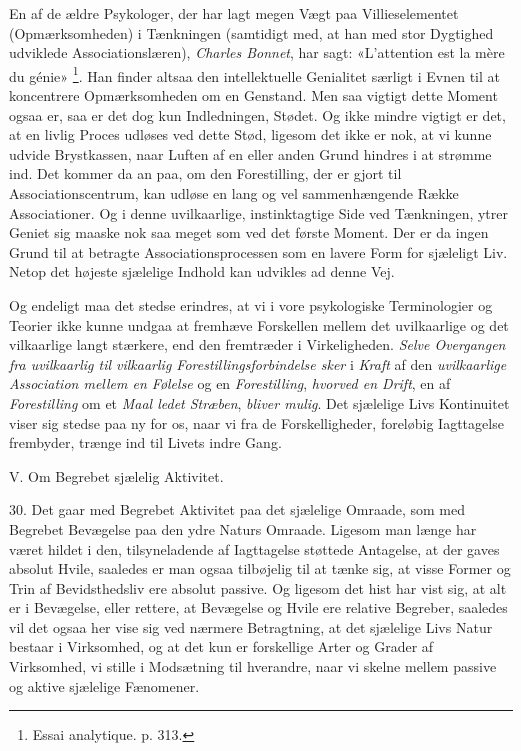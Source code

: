 \documentclass[12pt,a4paper,openany]{book}
\newcommand{\opage}[1]{\marginnote{\footnotesize\textit{[#1]}}}
\begin{document}
En af de ældre Psykologer, der har lagt megen Vægt paa Villieselementet
(Opmærksomheden) i Tænkningen (samtidigt med, at han med stor Dygtighed
udviklede Associationslæren), \emph{Charles Bonnet}, har sagt: «L'attention est
la mère du génie»%
\footnote[1]{Essai analytique. p. 313.}. Han finder altsaa den intellektuelle
Genialitet særligt i Evnen til at koncentrere Opmærksomheden om en Genstand.
Men saa vigtigt dette Moment ogsaa er, saa er det dog kun Indledningen, Stødet.
Og ikke mindre vigtigt er det, at en livlig Proces udløses ved dette Stød,
ligesom det ikke er nok, at vi kunne udvide Brystkassen, naar Luften af en
eller anden Grund hindres i at strømme ind. Det kommer da an paa, om den
Forestilling, der er gjort til Associationscentrum, kan udløse en lang og vel
sammenhængende Række Associationer. Og i denne uvilkaarlige, instinktagtige
Side ved Tænkningen, ytrer Geniet sig maaske nok saa meget som ved det første
Moment. Der er da ingen Grund til at betragte Associationsprocessen som en
lavere Form for sjæleligt Liv. Netop det højeste sjælelige Indhold kan udvikles
ad denne Vej.

Og endeligt maa det stedse erindres, at vi i vore psykologiske Terminologier og
Teorier ikke kunne undgaa at fremhæve Forskellen mellem det uvilkaarlige og det
vilkaarlige langt stærkere, end den fremtræder i Virkeligheden. \emph{Selve
Overgangen fra uvilkaarlig til vilkaarlig Forestillingsforbindelse sker} i
\emph{Kraft} af den \emph{uvilkaarlige Association mellem en Følelse} og en
\emph{Forestilling}, \emph{hvorved en Drift}, en af \emph{Forestilling} om et
\emph{Maal ledet Stræben}, \emph{bliver mulig}. Det sjælelige Livs Kontinuitet
viser sig stedse paa ny for os, naar vi fra de Forskelligheder, foreløbig
Iagttagelse frembyder, trænge ind til Livets indre Gang.

\begin{center}\large V. Om Begrebet sjælelig Aktivitet.\end{center}

30. Det gaar med Begrebet Aktivitet paa det sjælelige Omraade, som med Begrebet
Bevægelse paa den ydre Naturs Omraade. Ligesom man længe har været hildet i
den, tilsyneladende af Iagttagelse støttede Antagelse, at der gaves absolut
Hvile, saaledes er man ogsaa tilbøjelig til at tænke sig, at visse Former og
Trin af Bevidsthedsliv ere absolut passive. Og ligesom det hist har vist sig,
at alt er i Bevægelse, eller rettere, at Bevægelse og Hvile ere relative
Begreber, saaledes vil det ogsaa her vise sig ved nærmere Betragtning, at det
sjælelige Livs Natur bestaar i Virksomhed, og at det kun er forskellige
\setcounter{footnote}{0}%
\opage{68}Arter og Grader af Virksomhed, vi stille i Modsætning til hverandre,
naar vi skelne mellem passive og aktive sjælelige Fænomener.
\end{document}
